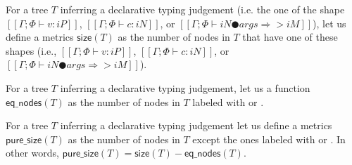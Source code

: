\newcommand{\pureSize}[1]{\ensuremath{\mathsf{pure\_size}(#1)}}
\newcommand{\eqNodes}[1]{\ensuremath{\mathsf{eq\_nodes}(#1)}}
\newcommand{\size}[1]{\ensuremath{\mathsf{size}(#1)}}

\begin{definition}
    For a tree $T$ inferring
    a declarative typing judgement 
    (i.e. the one of the shape
    $[[Γ ; Φ ⊢ v : iP]]$, 
    $[[Γ ; Φ ⊢ c : iN]]$, or 
    $[[Γ ; Φ ⊢ iN ● args ⇒> iM]]$),
    let us define a metrics $\size{T}$
    as the number of nodes in $T$ that 
    have one of these shapes
    (i.e., $[[Γ ; Φ ⊢ v : iP]]$, 
    $[[Γ ; Φ ⊢ c : iN]]$, or 
    $[[Γ ; Φ ⊢ iN ● args ⇒> iM]]$).
\end{definition}

\begin{definition}
    For a tree $T$ inferring
    a declarative typing judgement,
    let us a function $\eqNodes{T}$
    as the number of nodes in $T$ labeled with  or 
    .
\end{definition}

\begin{definition}
    For a tree $T$ inferring
    a declarative typing judgement 
    let us define a metrics $\pureSize{T}$
    as the number of nodes in $T$ except 
    the ones labeled with  or 
    .
    In other words, $\pureSize{T} = \size{T} - \eqNodes{T}$. 
\end{definition}


